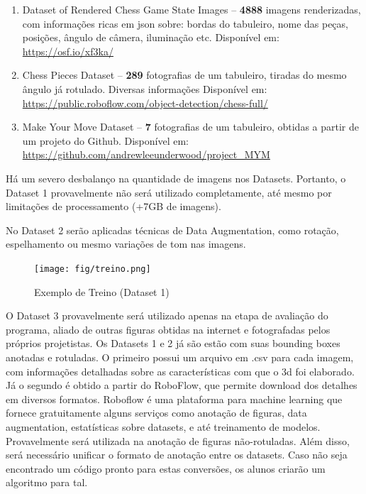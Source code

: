 \documentclass[a4paper,12pt,twoside]{article}
\begin{document}
\begin{enumerate}
    \item{Dataset of Rendered Chess Game State Images – 
          \textbf{4888} imagens renderizadas, com informações ricas em json sobre: bordas do tabuleiro, nome das peças, posições, ângulo de câmera, iluminação etc. 
                        Disponível em: \url{https://osf.io/xf3ka/}}
    \item{Chess Pieces Dataset – 
          \textbf{289} fotografias de um tabuleiro, tiradas do mesmo ângulo já rotulado. Diversas informações 
                        Disponível em: \url{https://public.roboflow.com/object-detection/chess-full/}}
    \item{Make Your Move Dataset – 
          \textbf{7} fotografias de um tabuleiro, obtidas a partir de um projeto do Github. 
                        Disponível em: \url{https://github.com/andrewleeunderwood/project\_MYM}}
\end{enumerate}

Há um severo desbalanço na quantidade de imagens nos Datasets. Portanto, o Dataset 1 provavelmente não será utilizado completamente, até mesmo por limitações de processamento (+7GB de imagens).

No Dataset 2 serão aplicadas técnicas de Data Augmentation, como rotação, espelhamento ou mesmo variações de tom nas imagens.

\begin{figure}[h!]
\centering
  \texttt{[image: fig/treino.png]}
\caption{Exemplo de Treino (Dataset 1)}
\label{fig:treino}
\end{figure}

O Dataset 3 provavelmente será utilizado apenas na etapa de avaliação do programa, aliado de outras figuras obtidas na internet e fotografadas pelos próprios projetistas.
Os Datasets 1 e 2 já são estão com suas bounding boxes anotadas e rotuladas.
O primeiro possui um arquivo em .csv para cada imagem, com informações detalhadas sobre as características com que o 3d foi elaborado. Já o segundo é obtido a partir do RoboFlow, que permite download dos detalhes em diversos formatos.
Roboflow é uma plataforma para machine learning que fornece gratuitamente alguns serviços como anotação de figuras, data augmentation, estatísticas sobre datasets, e até treinamento de modelos.
Provavelmente será utilizada na anotação de figuras não-rotuladas.
Além disso, será necessário unificar o formato de anotação entre os datasets.
Caso não seja encontrado um código pronto para estas conversões, os alunos criarão um algoritmo para tal.
\end{document}
